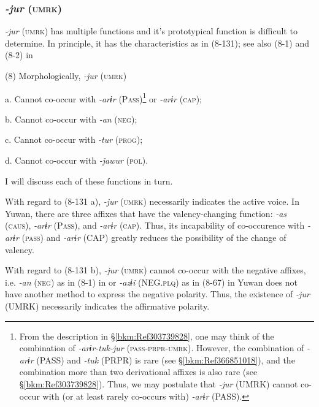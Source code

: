 \subsubsection{\textit{{}-jur} (\textsc{umrk})}

\textit{{}-jur} (\textsc{umrk}) has multiple functions and it’s prototypical function is difficult to determine. In principle, it has the characteristics as in (8-131); see also (8-1) and (8-2) in 

(8)  Morphologically, \textit{{}-jur} (\textsc{umrk})

  a.  Cannot co-occur with \textit{{}-arɨr} (P\textsc{ass})\footnote{From the description in §\ref{bkm:Ref303739828}, one may think of the combination of \textit{{}-arɨr-tuk-jur} (\textsc{pass}-\textsc{prpr}-\textsc{umrk}). However, the combination of \textit{{}-arɨr} (PASS) and \textit{{}-tuk} (PRPR) is rare (see §\ref{bkm:Ref366851018}), and the combination more than two derivational affixes is also rare (see §\ref{bkm:Ref303739828}). Thus, we may postulate that \textit{{}-jur} (UMRK) cannot co-occur with (or at least rarely co-occurs with) \textit{{}-arɨr} (PASS).} or \textit{{}-arɨr} (\textsc{cap});

  b.  Cannot co-occur with \textit{{}-an} (\textsc{neg});

  c.  Cannot co-occur with \textit{{}-tur} (\textsc{prog});

  d.  Cannot co-occur with \textit{{}-jawur} (\textsc{pol}).

I will discuss each of these functions in turn.

With regard to (8-131 a), \textit{{}-jur} (\textsc{umrk}) necessarily indicates the active voice. In Yuwan, there are three affixes that have the valency-changing function: \textit{-as} (\textsc{caus}), \textit{{}-arɨr} (P\textsc{ass}), and \textit{{}-arɨr} (\textsc{cap}). Thus, its incapability of co-occurence with \textit{{}-arɨr} (\textsc{pass}) and \textit{{}-arɨr} (CAP) greatly reduces the possibility of the change of valency.

With regard to (8-131 b), \textit{{}-jur} (\textsc{umrk}) cannot co-occur with the negative affixes, i.e. \textit{{}-an} (\textsc{neg}) as in (8-1) in  or \textit{{}-azɨi} (NEG.\textsc{plq}) as in (8-67) in  Yuwan does not have another method to express the negative polarity. Thus, the existence of \textit{{}-jur} (UMRK) necessarily indicates the affirmative polarity.

